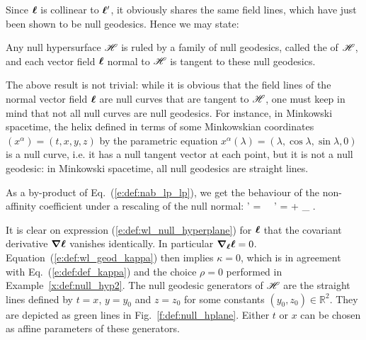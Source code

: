 Since $\bm{\ell}$ is collinear to $\bm{\ell}'$, it obviously shares the same field lines,
which have just been shown to be null geodesics. Hence we may state:

\begin{prop}
\label{p:def:null_geod_generators}
Any null hypersurface $\mathscr{H}$ is ruled by a family of null geodesics, called the
 of $\mathscr{H}$, and each vector field $\bm{\ell}$ normal to $\mathscr{H}$ is
tangent to these null geodesics.
\end{prop}

\begin{remark}
\label{r:def:null_curves}
The above result is not trivial: while it is obvious that the field lines of the normal
vector field $\bm{\ell}$ are null curves that are tangent to $\mathscr{H}$, one must
keep in mind that not all null curves are null geodesics. For instance, in
Minkowski spacetime, the helix defined in terms of
some Minkowskian coordinates $(x^\alpha)=(t,x,y,z)$ by the parametric equation
$x^\alpha(\lambda) = (\lambda, \cos\lambda, \sin\lambda, 0)$ is a null curve, i.e.
it has
a null tangent vector at each point, but it is not a null geodesic: in Minkowski
spacetime, all null geodesics are straight lines.
\end{remark}

As a by-product of Eq.~(\ref{e:def:nab_lp_lp}), we get the behaviour of the
non-affinity coefficient under a rescaling of the null normal:
\be \label{e:def:rescale_kappa}
    \wl' = \alpha \wl \ \Longrightarrow \ \kappa' = \alpha \kappa + \wnab_{\wl} \alpha .
\ee

\begin{example} \label{x:def:null_hyp3}
It is clear on expression (\ref{e:def:wl_null_hyperplane}) for $\bm{\ell}$ that
the covariant derivative
$\bm{\nabla} \bm{\ell}$ vanishes identically. In particular $\bm{\nabla}_{\bm{\ell}} \bm{\ell} = 0$.
Equation~(\ref{e:def:wl_geod_kappa}) then implies $\kappa = 0$,
which is in agreement with Eq.~(\ref{e:def:def_kappa}) and the choice $\rho=0$
performed in Example~\ref{x:def:null_hyp2}. The null geodesic generators of $\mathscr{H}$ are the
straight lines defined by $t=x$, $y=y_0$ and $z=z_0$ for some constants
$(y_0,z_0)\in \mathbb{R}^2$.
They are depicted as green lines in Fig.~\ref{f:def:null_hplane}.
 Either $t$ or $x$ can be chosen as affine
parameters of these generators.
\end{example}

